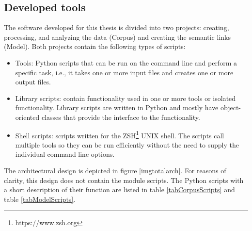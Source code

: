 \subsection{Developed tools}
\label{subsecPython}

The software developed for this thesis is divided into two projects: creating, processing, and analyzing the data (Corpus) and creating the semantic links (Model). Both projects contain the following types of scripts:
\begin{itemize}
  \item Tools: Python scripts that can be run on the command line and perform a specific task, i.e., it takes one or more input files and creates one or more output files.
  \item  Library scripts: contain functionality used in one or more tools or isolated functionality. Library scripts are written in Python and mostly have object-oriented classes that provide the interface to the functionality.
  \item Shell scripts: scripts written for the ZSH\footnote{https://www.zsh.org} UNIX shell. The scripts call multiple tools so they can be run efficiently without the need to supply the individual command line options.
\end{itemize}

The architectural design is depicted in figure \ref{imgtotalarch}. For reasons of clarity, this design does not contain the module scripts.
\iffalse 
The Python scripts with a short description of their function are listed in table \ref{tabCorpusScripts} and table \ref{tabModelScripts}. \\

